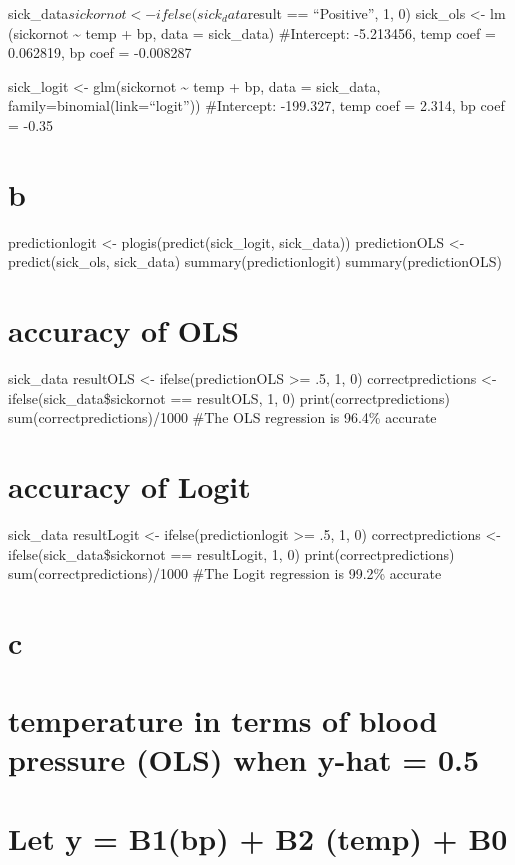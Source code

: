 \documentclass[]{article}
\begin{document}
sick\_data\(sickornot <- ifelse(sick_data\)result == ``Positive'', 1, 0)
sick\_ols \textless{}- lm (sickornot \textasciitilde{} temp + bp, data =
sick\_data) \#Intercept: -5.213456, temp coef = 0.062819, bp coef =
-0.008287

sick\_logit \textless{}- glm(sickornot \textasciitilde{} temp + bp, data
= sick\_data, family=binomial(link=``logit'')) \#Intercept: -199.327,
temp coef = 2.314, bp coef = -0.35

\section{b}\label{b}

predictionlogit \textless{}- plogis(predict(sick\_logit, sick\_data))
predictionOLS \textless{}- predict(sick\_ols, sick\_data)
summary(predictionlogit) summary(predictionOLS)

\section{accuracy of OLS}\label{accuracy-of-ols}

sick\_data resultOLS \textless{}- ifelse(predictionOLS \textgreater{}=
.5, 1, 0) correctpredictions \textless{}- ifelse(sick\_data\$sickornot
== resultOLS, 1, 0) print(correctpredictions)
sum(correctpredictions)/1000 \#The OLS regression is 96.4\% accurate

\section{accuracy of Logit}\label{accuracy-of-logit}

sick\_data resultLogit \textless{}- ifelse(predictionlogit
\textgreater{}= .5, 1, 0) correctpredictions \textless{}-
ifelse(sick\_data\$sickornot == resultLogit, 1, 0)
print(correctpredictions) sum(correctpredictions)/1000 \#The Logit
regression is 99.2\% accurate

\section{c}\label{c}

\section{temperature in terms of blood pressure (OLS) when y-hat =
0.5}\label{temperature-in-terms-of-blood-pressure-ols-when-y-hat-0.5}

\section{Let y = B1(bp) + B2 (temp) + B0}\label{let-y-b1bp-b2-temp-b0}
\end{document}
